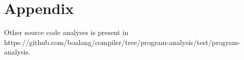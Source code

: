 \chapter{Appendix}
\label{sec:appendix}






















Other source code analyses is present in https://github.com/boalang/compiler/tree/program-analysis/test/program-analysis.